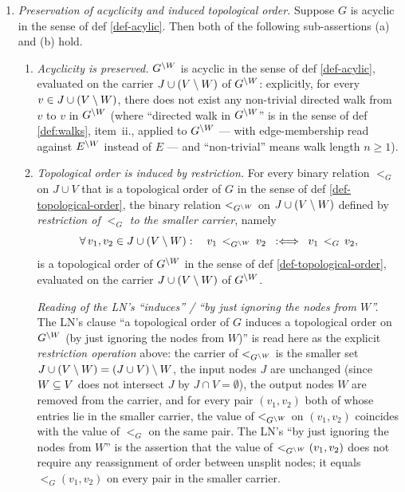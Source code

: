 \documentclass[main]{subfiles}
\begin{document}
\begin{Rem}[MargPreservesAncestors]
\begin{enumerate}[label=\roman*.)]
\begin{enumerate}[label=(\alph*)]
\begin{itemize}
                    \end{itemize}
            \end{enumerate}
            The biconditional in (a) is the LN's ``parenthetical clauses omitted'' reading; the biconditional in (b) is the LN's ``parenthetical clauses included'' reading. The addition to the LN explicitly authorises asserting both.

        \item \emph{Preservation of acyclicity and induced topological order.}
            Suppose $G$ is acyclic in the sense of def \ref{def-acylic}. Then both of the following sub-assertions (a) and (b) hold.
            \begin{enumerate}[label=(\alph*)]
                \item \emph{Acyclicity is preserved.}
                    $G^{\setminus W}$ is acyclic in the sense of def \ref{def-acylic}, evaluated on the carrier $J \cup (V \setminus W)$ of $G^{\setminus W}$: explicitly, for every $v \in J \cup (V \setminus W)$, there does not exist any non-trivial directed walk from $v$ to $v$ in $G^{\setminus W}$ (where ``directed walk in $G^{\setminus W}$'' is in the sense of def \ref{def:walks}, item~ii., applied to $G^{\setminus W}$ --- with edge-membership read against $E^{\setminus W}$ instead of $E$ --- and ``non-trivial'' means walk length $n \ge 1$).

                \item \emph{Topological order is induced by restriction.}
                    For every binary relation $<_G$ on $J \cup V$ that is a topological order of $G$ in the sense of def \ref{def-topological-order}, the binary relation $<_{G^{\setminus W}}$ on $J \cup (V \setminus W)$ defined by \emph{restriction of $<_G$ to the smaller carrier}, namely
                    \[
                        \forall\, v_1, v_2 \in J \cup (V \setminus W) :\quad
                        v_1 \,<_{G^{\setminus W}}\, v_2 \;\;:\Longleftrightarrow\;\; v_1 \,<_G\, v_2,
                    \]
                    is a topological order of $G^{\setminus W}$ in the sense of def \ref{def-topological-order}, evaluated on the carrier $J \cup (V \setminus W)$ of $G^{\setminus W}$.

                    \emph{Reading of the LN's ``induces'' / ``by just ignoring the nodes from $W$''.}
                    The LN's clause ``a topological order of $G$ induces a topological order on $G^{\setminus W}$ (by just ignoring the nodes from $W$)'' is read here as the explicit \emph{restriction operation} above: the carrier of $<_{G^{\setminus W}}$ is the smaller set $J \cup (V \setminus W) = (J \cup V) \setminus W$, the input nodes $J$ are unchanged (since $W \subseteq V$ does not intersect $J$ by $J \cap V = \emptyset$), the output nodes $W$ are removed from the carrier, and for every pair $(v_1, v_2)$ both of whose entries lie in the smaller carrier, the value of $<_{G^{\setminus W}}$ on $(v_1, v_2)$ coincides with the value of $<_G$ on the same pair. The LN's ``by just ignoring the nodes from $W$'' is the assertion that the value of $<_{G^{\setminus W}}(v_1, v_2)$ does not require any reassignment of order between unsplit nodes; it equals $<_G(v_1, v_2)$ on every pair in the smaller carrier.


\end{enumerate}
\end{enumerate}
\end{Rem}
\end{document}
